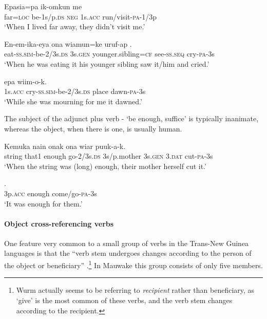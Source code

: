 \ea%
\label{ex:3:x305}
\gll Epasia=pa ik-omkun me   \\
far=\textsc{loc} be-1s/p.\textsc{ds} \textsc{neg} 1s.\textsc{acc} run/visit-\textsc{pa}-1/3p\\
\glt`When I lived far away, they didn't visit me.'
\z

\ea%
\label{ex:3:x1059}
\gll En-em-ika-eya ona wiamun=ke uruf-ap .\\
eat-\textsc{ss}.\textsc{sim}-be-2/3s.\textsc{ds} 3s.\textsc{gen} younger.sibling=\textsc{cf} see-\textsc{ss}.\textsc{seq} cry-\textsc{pa}-3s\\
\glt`When he was eating it his younger sibling saw it/him and cried.'
\z

\ea%
\label{ex:3:x1060}
\gll {}  epa wiim-o-k. \\
1s.\textsc{acc} cry-\textsc{ss}.\textsc{sim}-be-2/3s.\textsc{ds} place dawn-\textsc{pa}-3s\\
\glt`While she was mourning for me it dawned.'
\z

The subject of the adjunct plus verb - `be enough, suffice' is typically inanimate, whereas the object, when there is one, is usually human. 

\ea%
\label{ex:3:x1058}
\gll Kemuka nain   onak ona wiar puuk-a-k.\\
string that1 enough go-2/3s.\textsc{ds} 3s/p.mother 3s.\textsc{gen} 3.\textsc{dat} cut-\textsc{pa}-3s\\
\glt`When the string was (long) enough, their mother herself cut it.'
\z

\ea%
\label{ex:3:x306}
\gll {}  . \\
3p.\textsc{acc} enough come/go-\textsc{pa}-3s \\
\glt`It was enough for them.'
\z

\paragraph{Object cross-referencing verbs}\label{sec:3.8.4.2.4}
{}
One feature very common to a small group of verbs in the Trans-New Guinea languages is that the ``{verb stem undergoes changes according to the person of the object or beneficiary}'' \citep[62]{Wurm1982}.\footnote{Wurm actually seems to be referring to \textit{recipient} rather than beneficiary, as `give' is the most common of these verbs, and the verb stem changes according to the recipient.} In Mauwake this group consists of only five members. 

